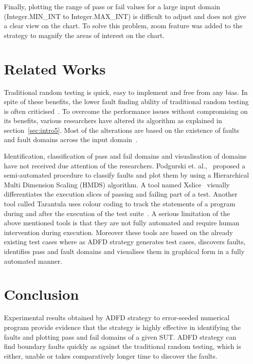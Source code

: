 Finally, plotting the range of pass or fail values for a large input domain (Integer.MIN\_INT to Integer.MAX\_INT) is difficult to adjust and does not give a clear view on the chart. To solve this problem, zoom feature was added to the strategy to magnify the areas of interest on the chart.



\section{Related Works} \label{sec:relatedWork}
Traditional random testing is quick, easy to implement and free from any bias. In spite of these benefits, the lower fault finding ability of traditional random testing is often criticised~\cite{Myers2011, Offutt1996}. To overcome the performance issues without compromising on its benefits, various researchers have altered its algorithm as explained in section~\ref{sec:intro5}. Most of the alterations are based on the existence of faults and fault domains across the input domain~\cite{Chan1996}. 

Identification, classification of pass and fail domains and visualisation of domains have not received due attention of the researchers. Podgurski et. al.,~\cite{Podgurski2003} proposed a semi-automated procedure to classify faults and plot them by using a Hierarchical Multi Dimension Scaling (HMDS) algorithm. A tool named Xslice~\cite{agrawal1995fault} visually differentiates the execution slices of passing and failing part of a test. Another tool called Tarantula uses colour coding to track the statements of a program during and after the execution of the test suite~\cite{Jones2002}. A serious limitation of the above mentioned tools is that they are not fully automated and require human intervention during execution. Moreover these tools are based on the already existing test cases where as ADFD strategy generates test cases, discovers faults, identifies pass and fault domains and visualises them in graphical form in a fully automated manner. 


\section{Conclusion} \label{sec:conclusion}
Experimental results obtained by ADFD strategy to error-seeded numerical program provide evidence that the strategy is highly effective in identifying the faults and plotting pass and fail domains of a given SUT. ADFD strategy can find boundary faults quickly as against the traditional random testing, which is either, unable or takes comparatively longer time to discover the faults.


